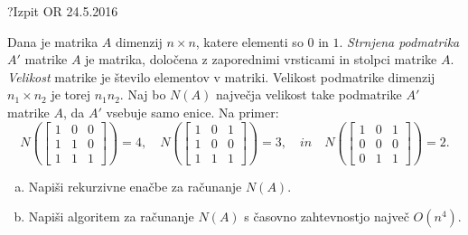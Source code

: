 \begin{naloga}{?}{Izpit OR 24.5.2016}
\begin{vprasanje}
Dana je matrika $A$ dimenzij $n \times n$, katere elementi so $0$ in $1$.
{\em Strnjena podmatrika} $A'$ matrike $A$ je matrika,
določena z zaporednimi vrsticami in stolpci matrike $A$.
{\em Velikost} matrike je število elementov v matriki.
Velikost podmatrike dimenzij $n_1 \times n_2$ je torej $n_1 n_2$.
Naj bo $N(A)$ največja velikost take podmatrike $A'$ matrike $A$,
da $A'$ vsebuje samo enice.
Na primer:
$$
N\left(\begin{bmatrix}
1 & 0 & 0 \\
1 & 1 & 0 \\
1 & 1 & 1
\end{bmatrix}\right) = 4, \quad
N\left(\begin{bmatrix}
1 & 0 & 1 \\
1 & 0 & 0 \\
1 & 1 & 1
\end{bmatrix}\right) = 3, \quad in \quad
N\left(\begin{bmatrix}
1 & 0 & 1 \\
0 & 0 & 0 \\
0 & 1 & 1
\end{bmatrix}\right) = 2.
$$

\begin{enumerate}[(a)]
\item Napiši rekurzivne enačbe za računanje $N(A)$.

\item Napiši algoritem za računanje $N(A)$
s časovno zahtevnostjo največ $O(n^4)$.
\end{enumerate}
\end{vprasanje}
\begin{odgovor}
\end{odgovor}
\end{naloga}
